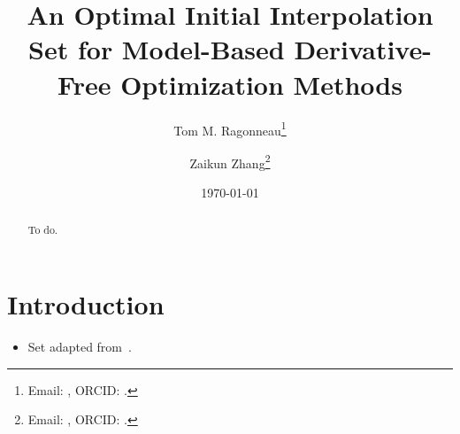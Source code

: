 \documentclass[twoside]{article}
\title{An Optimal Initial Interpolation Set for Model-Based Derivative-Free Optimization Methods}
\author{
    Tom M. Ragonneau\thanks{Email: \email{tom.ragonneau@polyu.edu.hk}, ORCID: \orcid{0000-0003-2717-2876}.}
    \and
    Zaikun Zhang\thanks{Email: \email{zaikun.zhang@polyu.edu.hk}, ORCID: \orcid{0000-0001-8934-8190}.}
}
\date{\today}
\begin{document}
\maketitle

\begin{abstract}
    To do.
\end{abstract}

\section{Introduction}

\begin{itemize}
    \item Set adapted from~\cite{Powell_2006}.
\end{itemize}



\end{document}
